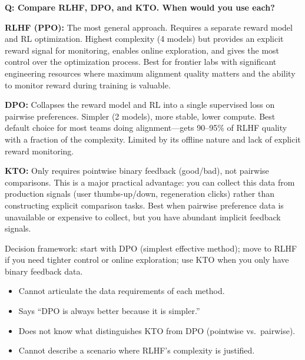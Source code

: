 \begin{interviewq}
\end{interviewq}

\begin{interviewq}
\textbf{Q: Compare RLHF, DPO, and KTO.  When would you use each?}

 \quad {} \quad
\badgefreq{\freqmed}

\stronganswer
\textbf{RLHF (PPO):} The most general approach.  Requires a separate
reward model and RL optimization.  Highest complexity (4 models) but
provides an explicit reward signal for monitoring, enables online
exploration, and gives the most control over the optimization process.
Best for frontier labs with significant engineering resources where maximum
alignment quality matters and the ability to monitor reward during training
is valuable.

\textbf{DPO:} Collapses the reward model and RL into a single supervised
loss on pairwise preferences.  Simpler (2 models), more stable, lower
compute.  Best default choice for most teams doing alignment---gets 90--95\%
of RLHF quality with a fraction of the complexity.  Limited by its offline
nature and lack of explicit reward monitoring.

\textbf{KTO:} Only requires pointwise binary feedback (good/bad), not
pairwise comparisons.  This is a major practical advantage: you can
collect this data from production signals (user thumbs-up/down, regeneration
clicks) rather than constructing explicit comparison tasks.  Best when
pairwise preference data is unavailable or expensive to collect, but you
have abundant implicit feedback signals.

Decision framework: start with DPO (simplest effective method); move to
RLHF if you need tighter control or online exploration; use KTO when you
only have binary feedback data.

\redflags
\begin{itemize}
\item Cannot articulate the data requirements of each method.
\item Says ``DPO is always better because it is simpler.''
\item Does not know what distinguishes KTO from DPO (pointwise vs.\ pairwise).
\item Cannot describe a scenario where RLHF's complexity is justified.
\end{itemize}


\end{interviewq}
